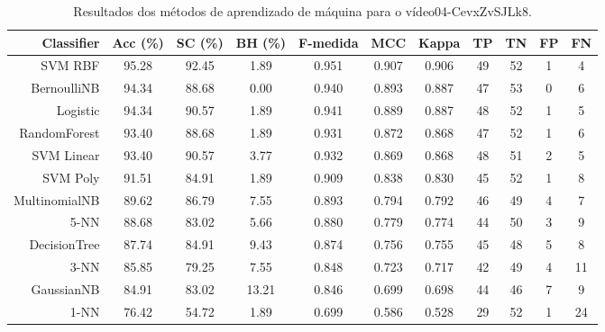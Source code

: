 \begin{table}[!htb]
\centering
\caption{Resultados dos métodos de aprendizado de máquina para o vídeo04-CevxZvSJLk8.}
\label{tab:04-CevxZvSJLk8}
\begin{tabular}{r|c|c|c|c|c|c|c|c|c|c}
\hline\hline
Classifier & Acc (\%) & SC (\%) & BH (\%) & F-medida & MCC & Kappa & TP & TN & FP & FN \\ \hline
SVM RBF & 95.28 & 92.45 & 1.89 & 0.951 & 0.907 & 0.906 & 49 & 52 & 1 & 4 \\ 
BernoulliNB & 94.34 & 88.68 & 0.00 & 0.940 & 0.893 & 0.887 & 47 & 53 & 0 & 6 \\ 
Logistic & 94.34 & 90.57 & 1.89 & 0.941 & 0.889 & 0.887 & 48 & 52 & 1 & 5 \\ 
RandomForest & 93.40 & 88.68 & 1.89 & 0.931 & 0.872 & 0.868 & 47 & 52 & 1 & 6 \\ 
SVM Linear & 93.40 & 90.57 & 3.77 & 0.932 & 0.869 & 0.868 & 48 & 51 & 2 & 5 \\ 
SVM Poly & 91.51 & 84.91 & 1.89 & 0.909 & 0.838 & 0.830 & 45 & 52 & 1 & 8 \\ 
MultinomialNB & 89.62 & 86.79 & 7.55 & 0.893 & 0.794 & 0.792 & 46 & 49 & 4 & 7 \\ 
5-NN & 88.68 & 83.02 & 5.66 & 0.880 & 0.779 & 0.774 & 44 & 50 & 3 & 9 \\ 
DecisionTree & 87.74 & 84.91 & 9.43 & 0.874 & 0.756 & 0.755 & 45 & 48 & 5 & 8 \\ 
3-NN & 85.85 & 79.25 & 7.55 & 0.848 & 0.723 & 0.717 & 42 & 49 & 4 & 11 \\ 
GaussianNB & 84.91 & 83.02 & 13.21 & 0.846 & 0.699 & 0.698 & 44 & 46 & 7 & 9 \\ 
1-NN & 76.42 & 54.72 & 1.89 & 0.699 & 0.586 & 0.528 & 29 & 52 & 1 & 24 \\ 
\hline\hline
\end{tabular}
\end{table}
